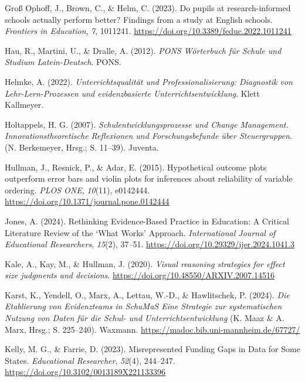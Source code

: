 \documentclass[
  jou,
  floatsintext,
  longtable,
  nolmodern,
  notxfonts,
  notimes,
  colorlinks=true,linkcolor=blue,citecolor=blue,urlcolor=blue]{apa7}
\newlength{\cslhangindent}
\newenvironment{CSLReferences}[2] %
 {\begin{list}{}{%
  \setlength{\itemindent}{0pt}
  \setlength{\leftmargin}{0pt}
  \setlength{\parsep}{0pt}
  \ifodd #1
   \setlength{\leftmargin}{\cslhangindent}
   \setlength{\itemindent}{-1\cslhangindent}
  \fi
  \setlength{\itemsep}{#2\baselineskip}}}
 {\end{list}}
\begin{document}
\begin{CSLReferences}{1}{0}
Groß Ophoff, J., Brown, C., \& Helm, C. (2023). Do pupils at
research-informed schools actually perform better? Findings from a study
at English schools. \emph{Frontiers in Education}, \emph{7}, 1011241.
\url{https://doi.org/10.3389/feduc.2022.1011241}

Hau, R., Martini, U., \& Dralle, A. (2012). \emph{PONS Wörterbuch für
Schule und Studium Latein-Deutsch}. PONS.

Helmke, A. (2022). \emph{Unterrichtsqualität und Professionalisierung:
Diagnostik von Lehr-Lern-Prozessen und evidenzbasierte
Unterrichtsentwicklung}. Klett Kallmeyer.

Holtappels, H. G. (2007). \emph{Schulentwicklungsprozesse und Change
Management. Innovationstheoretische Reflexionen und Forschungsbefunde
über Steuergruppen.} (N. Berkemeyer, Hrsg.; S. 11--39). Juventa.

Hullman, J., Resnick, P., \& Adar, E. (2015). Hypothetical outcome plots
outperform error bars and violin plots for inferences about reliability
of variable ordering. \emph{PLOS ONE}, \emph{10}(11), e0142444.
\url{https://doi.org/10.1371/journal.pone.0142444}

Jones, A. (2024). Rethinking Evidence-Based Practice in Education: A
Critical Literature Review of the {`}What Works{'} Approach.
\emph{International Journal of Educational Researchers}, \emph{15}(2),
37--51. \url{https://doi.org/10.29329/ijer.2024.1041.3}

Kale, A., Kay, M., \& Hullman, J. (2020). \emph{Visual reasoning
strategies for effect size judgments and decisions}.
\url{https://doi.org/10.48550/ARXIV.2007.14516}

Karst, K., Yendell, O., Marx, A., Lettau, W.-D., \& Hawlitschek, P.
(2024). \emph{Die Etablierung von Evidenzteams in SchuMaS {\textendash}
Eine Strategie zur systematischen Nutzung von Daten für die Schul- und
Unterrichtsentwicklung} (K. Maaz \& A. Marx, Hrsg.; S. 225--240).
Waxmann. \url{https://madoc.bib.uni-mannheim.de/67727/}

Kelly, M. G., \& Farrie, D. (2023). Misrepresented Funding Gaps in Data
for Some States. \emph{Educational Researcher}, \emph{52}(4), 244--247.
\url{https://doi.org/10.3102/0013189X221133396}


\end{CSLReferences}
\end{document}
